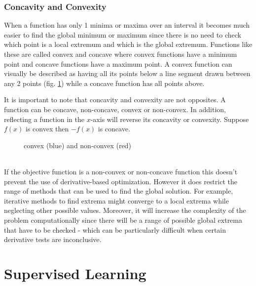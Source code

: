 \documentclass[10pt,a4paper]{report}
\begin{document}
			\subsection{Concavity and Convexity}
				When a function has only 1 minima or maxima over an interval it becomes much easier to find the global minimum
				or maximum since there is no need to check which point is a local extremum and which is the global extremum. Functions like these are
				called convex and concave where convex functions have a minimum point and concave functions have a maximum point.
				A convex function \autocite{vandenberghe2004convex} can visually be described as having all its points below a line segment drawn
				between any 2 points (fig. \ref{fig:convexity}) while a concave function has all points above. \par
				It is important to note that concavity and convexity are not opposites. A function can be concave, non-concave, convex or non-convex.
				In addition, reflecting a function in the $x$-axis will reverse its concavity or convexity. Suppose $f(x)$ is convex then $-f(x)$ is concave.
				\begin{figure}[h]
					\centering
					\caption{convex (blue) and non-convex (red)}
					\label{fig:convexity}
				\end{figure} \\
				If the objective function is a non-convex or non-concave function this doesn't prevent the use of derivative-based optimization. However
				it does restrict the range of methods that can be used to find the global solution. For example, iterative methods to find extrema might converge to a local extrema while neglecting other possible values. Moreover, it will increase the complexity of the problem
				computationally since there will be a range of possible global extrema that have to be checked - which can be particularly difficult when
				certain derivative tests are inconclusive.

	\chapter{Supervised Learning}
\end{document}
